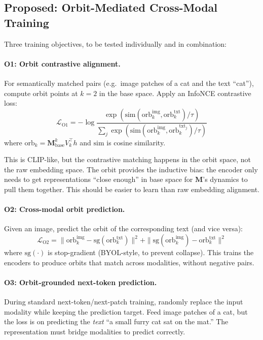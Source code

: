 \documentclass[11pt, a4paper]{article}
\newcommand{\M}{\mathbf{M}}
\theoremstyle{plain}
\theoremstyle{remark}
\begin{document}
\subsection{Proposed: Orbit-Mediated Cross-Modal Training}

Three training objectives, to be tested individually and in combination:

\paragraph{O1: Orbit contrastive alignment.}
For semantically matched pairs (e.g.\ image patches of a cat and the text ``cat''), compute orbit points at $k{=}2$ in the base space.
Apply an InfoNCE contrastive loss:
\begin{equation}
    \mathcal{L}_{\text{O1}} = -\log \frac{\exp(\text{sim}(\text{orb}_k^{\text{img}}, \text{orb}_k^{\text{txt}}) / \tau)}{\sum_{j} \exp(\text{sim}(\text{orb}_k^{\text{img}}, \text{orb}_k^{\text{txt}_j}) / \tau)}
\end{equation}
where $\text{orb}_k = \M_{\text{base}}^k V_k^\top h$ and $\text{sim}$ is cosine similarity.

This is CLIP-like, but the contrastive matching happens in the orbit space, not the raw embedding space.
The orbit provides the inductive bias: the encoder only needs to get representations ``close enough'' in base space for $\M$'s dynamics to pull them together.
This should be easier to learn than raw embedding alignment.

\paragraph{O2: Cross-modal orbit prediction.}
Given an image, predict the orbit of the corresponding text (and vice versa):
\begin{equation}
    \mathcal{L}_{\text{O2}} = \| \text{orb}_k^{\text{img}} - \text{sg}(\text{orb}_k^{\text{txt}}) \|^2 + \| \text{sg}(\text{orb}_k^{\text{img}}) - \text{orb}_k^{\text{txt}} \|^2
\end{equation}
where $\text{sg}(\cdot)$ is stop-gradient (BYOL-style, to prevent collapse).
This trains the encoders to produce orbits that match across modalities, without negative pairs.

\paragraph{O3: Orbit-grounded next-token prediction.}
During standard next-token/next-patch training, randomly replace the input modality while keeping the prediction target.
Feed image patches of a cat, but the loss is on predicting the \emph{text} ``a small furry cat sat on the mat.''
The representation must bridge modalities to predict correctly.
\end{document}
